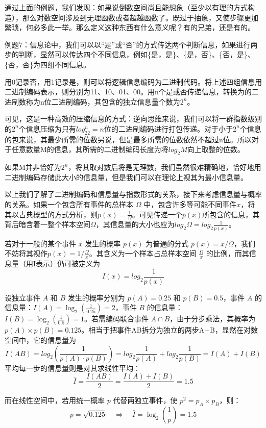 \documentclass[fontset=none]{ctexart}
\begin{document}
\kaishu
通过上面的例题，我们发现：如果说倒数空间尚且能想象（至少以有理的方式构造），那么对数空间涉及到无理函数或者超越函数了。既过于抽象，又使步骤更加繁琐，何必多此一举。那么定义这种东西有什么意义呢？有的兄弟，还是有的。

\lishu
例题7：信息论中，我们可以以“是”或“否”的方式传达两个判断信息，如果进行两步的判断，显然可以传达四个不同信息，例如\{是，是\}、\{是，否\}、\{否，是\}、\{否，否\}为四组不同信息。

用0记录否，用1记录是，则可以将逻辑信息编码为二进制代码。将上述四组信息用二进制编码表示，则分别为11、10、01、00。用n个是或否传递信息，转换为的二进制数称为n位二进制编码，其包含的独立信息量个数为$2^n$。

可见，这是一种高效的压缩信息的方式：逆向思维来说，我们可以将一群指数级别的$2^n$个信息压缩为只有$log_22^n=n$位的二进制编码进行打包传递。对于小于$2^n$个信息的包来说，其最少所需的位数另说，但是最多所需的位数依然不超过n位。所以对于任意数量M的信息，其所需的二进制编码长度为将$log_2M$向上取整的位数。

如果M并非恰好为$2^n$，将其取对数后将是无理数，我们虽然很难精确地，恰好地用二进制编码存储此大小的信息量，但是我们可以在理论上视其为最小信息量。

以上我们了解了二进制编码和信息量与指数形式的关系，接下来考虑信息量与概率的关系。如果一个包含所有事件的总样本 $\Omega$ 中，包含许多等可能不同事件$x$，将其以古典概型的方式分析，则$p(x)=\frac{1}{\Omega}$。可见传递一个$p(x)$所包含的信息，其背后暗含着一整个样本空间$\Omega$，其信息量的大小也应为$log_2\Omega = log_2\frac{1}{p(x)}$。

若对于一般的某个事件 $x$ 发生的概率 $p(x)$ 为普通的分式 $p(x)=x/\Omega$，我们不妨将其视作$p(x)=1/\frac{\Omega}{x}$。其含义为一个样本占总样本空间 $\frac{\Omega}{x}$ 的比例，而其信息量（用I表示）仍可被定义为$$I(x)=log_2\frac{1}{p(x)}$$

设独立事件 \( A \) 和 \( B \) 发生的概率分别为 \( p(A) = 0.25 \) 和 \( p(B) = 0.5 \)，事件 \( A \) 的信息量：$I(A) = \log_2\left(\frac{1}{0.25}\right) = 2 $，事件 \( B \) 的信息量：$I(B) = \log_2\left(\frac{1}{0.5}\right) = 1 $。若需编码联合事件 \( A \cap B \)，由于分步乘法，其概率为 \( p(A) \times p(B) = 0.125 \)。相当于把事件AB拆分为独立的两步A+B，显然在对数空间中，它的信息量为$$I(AB) = log_2(\frac{1}{p(A) \cdot p(B)}) = log_2\frac{1}{p(A)}+log_2\frac{1}{p(B)} = I(A)+I(B)$$平均每一步的信息量则是对其求线性平均：$$\bar{I}=\frac{I(AB)}{2}=\frac{I(A)+I(B)}{2}=1.5$$

而在线性空间中，若用统一概率 \( p \) 代替两独立事件，使 \( p^2 = p_A \times p_B \)，则：\[p = \sqrt{0.125}  \quad \Rightarrow \quad \bar{I} = \log_2\left(\frac{1}{p}\right) = 1.5 \]
\end{document}
